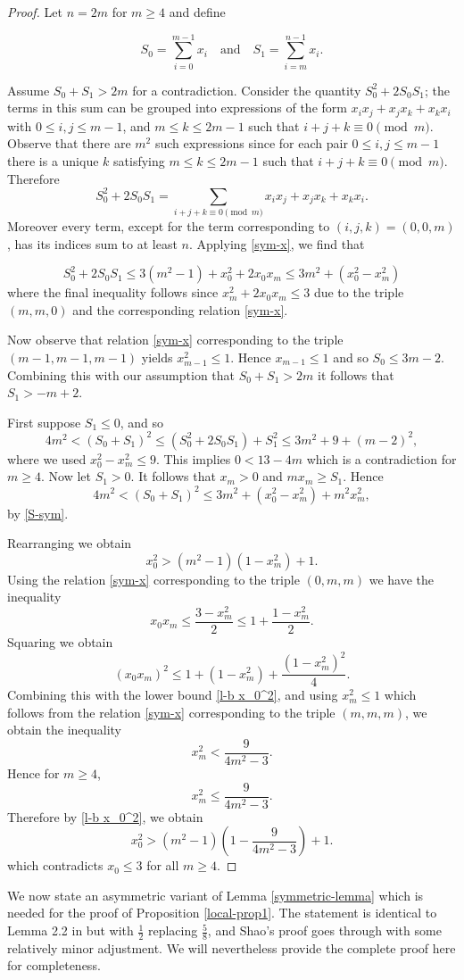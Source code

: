 \documentclass[a4paper,11pt,twoside]{amsart}
\theoremstyle{definition}
\numberwithin{equation}{section}
\begin{document}
\begin{proof}
Let $n = 2m$ for $m \geq 4$ and define 

\[
S_0 = \sum_{i = 0}^{m-1}x_i \quad \textrm{and} \quad S_1 = \sum_{i = m}^{n-1}x_i.
\]


Assume $S_0 + S_1 > 2m$ for a contradiction. Consider the quantity $S_0^2 + 2S_0S_1$; the terms in this sum can be grouped into expressions of the form $x_ix_j + x_jx_k + x_kx_i$ with $0 \leq i,j \leq m-1$, and $m \leq k \leq 2m-1$ such that $i + j + k \equiv 0 \pmod{m}.$ Observe that there are $m^2$ such expressions since for each pair $0 \leq i,j \leq m-1$ there is a unique $k$ satisfying $m \leq k \leq 2m-1$ such that $i + j + k \equiv 0 \pmod{m}.$ Therefore $$S_0^2 + 2S_0S_1 = \sum_{i + j + k \equiv 0 \pmod m}x_ix_j +x_jx_k + x_kx_i.$$ Moreover every term, except for the term corresponding to $(i,j,k) = (0,0,m)$, has its indices sum to at least $n$. Applying \eqref{sym-x}, we find that 

\begin{equation}
    S_0^2 + 2S_0S_1 \leq 3(m^2 -1) + x_0^2 + 2x_0x_m \leq 3m^2 + (x_0^2 - x_m^2) \label{S-sym}
\end{equation} where the final inequality follows since $x_m^2 + 2x_0x_m \leq 3$ due to the triple $(m,m,0)$ and the corresponding relation \eqref{sym-x}.

Now observe that relation \eqref{sym-x} corresponding to the triple $(m-1,m-1,m-1)$ yields $x_{m-1}^2 \leq 1.$ Hence $x_{m-1} \leq 1$ and so $S_0 \leq 3m  - 2.$ Combining this with our assumption that $S_0 + S_1 > 2m$ it follows that $S_1 > -m +2.$ 

First suppose $S_1 \leq 0$, and so $$4m^2 < (S_0+S_1)^2 \leq (S_0^2 + 2S_0S_1)  + S_1^2 \leq 3m^2 + 9 + (m-2)^2,$$ where we used $x_0^2 - x_m^2 \leq 9$. This implies $0 < 13 - 4m$ which is a contradiction for $m \geq 4.$ Now let $S_1 > 0.$ It follows that $x_m > 0$ and $mx_m \geq S_1.$ Hence $$4m^2 < (S_0 + S_1)^2 \leq 3m^2 + (x_0^2 - x_m^2) + m^2x_m^2,$$ by \eqref{S-sym}. 

Rearranging we obtain \begin{equation}
    x_0^2 > (m^2-1)(1-x_m^2) +1. \label{l-b x_0^2}
\end{equation} Using the relation \eqref{sym-x} corresponding to the triple $(0,m,m)$ we have the inequality $$x_0x_m \leq \frac{3-x_m^2}{2} \leq 1 + \frac{1-x_m^2}{2}.$$ Squaring we obtain $$(x_0x_m)^2 \leq 1 + (1-x_m^2) + \frac{(1-x_m^2)^2}{4}.$$ Combining this with the lower bound \eqref{l-b x_0^2}, and using $x_m^2 \leq 1$ which follows from the relation \eqref{sym-x} corresponding to the triple $(m,m,m)$, we obtain the inequality $$x_m^2 < \frac{9}{4m^2 - 3}.$$ Hence for $m \geq 4$, $$x_m^2 \leq \frac{9}{4m^2-3}.$$ Therefore by \eqref{l-b x_0^2}, we obtain $$x_0^2 > (m^2 - 1)(1 - \frac{9}{4m^2-3}) + 1.$$ which contradicts $x_0 \leq 3$ for all $m \geq 4$.
\end{proof}
We now state an asymmetric variant of Lemma \ref{symmetric-lemma} which is needed for the proof of Proposition \ref{local-prop1}. The statement is identical to Lemma 2.2 in \cite{Shao} but with $\frac{1}{2}$ replacing $\frac{5}{8}$, and Shao's proof goes through with some relatively minor adjustment. We will nevertheless provide the complete proof here for completeness.
\end{document}
